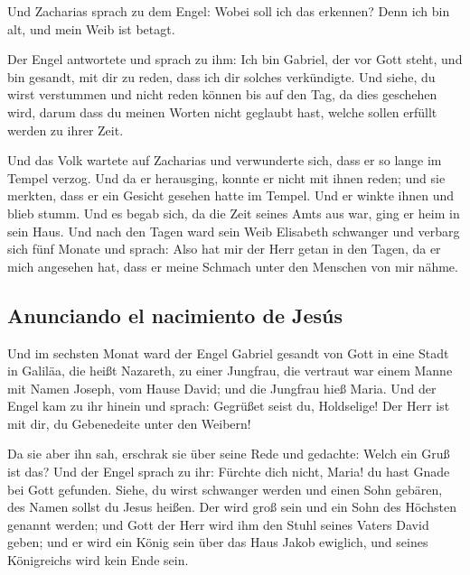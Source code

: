  Und Zacharias sprach zu dem Engel: Wobei soll ich das
erkennen? Denn ich bin alt, und mein Weib ist betagt.

 Der Engel antwortete und sprach zu ihm: Ich bin Gabriel,
der vor Gott steht, und bin gesandt, mit dir zu reden, dass ich dir
solches verkündigte.  Und siehe, du wirst verstummen und
nicht reden können bis auf den Tag, da dies geschehen wird, darum dass
du meinen Worten nicht geglaubt hast, welche sollen erfüllt werden zu
ihrer Zeit.

 Und das Volk wartete auf Zacharias und verwunderte sich,
dass er so lange im Tempel verzog.  Und da er herausging,
konnte er nicht mit ihnen reden; und sie merkten, dass er ein Gesicht
gesehen hatte im Tempel. Und er winkte ihnen und blieb stumm.
 Und es begab sich, da die Zeit seines Amts aus war, ging
er heim in sein Haus.  Und nach den Tagen ward sein Weib
Elisabeth schwanger und verbarg sich fünf Monate und sprach:
 Also hat mir der Herr getan in den Tagen, da er mich
angesehen hat, dass er meine Schmach unter den Menschen von mir nähme.

\hypertarget{anunciando-el-nacimiento-de-jesuxfas}{%
\subsection{Anunciando el nacimiento de
Jesús}\label{anunciando-el-nacimiento-de-jesuxfas}}

 Und im sechsten Monat ward der Engel Gabriel gesandt von
Gott in eine Stadt in Galiläa, die heißt Nazareth,  zu
einer Jungfrau, die vertraut war einem Manne mit Namen Joseph, vom Hause
David; und die Jungfrau hieß Maria.  Und der Engel kam zu
ihr hinein und sprach: Gegrüßet seist du, Holdselige! Der Herr ist mit
dir, du Gebenedeite unter den Weibern!

 Da sie aber ihn sah, erschrak sie über seine Rede und
gedachte: Welch ein Gruß ist das?  Und der Engel sprach
zu ihr: Fürchte dich nicht, Maria! du hast Gnade bei Gott gefunden.
 Siehe, du wirst schwanger werden und einen Sohn gebären,
des Namen sollst du Jesus heißen.  Der wird groß sein und
ein Sohn des Höchsten genannt werden; und Gott der Herr wird ihm den
Stuhl seines Vaters David geben;  und er wird ein König
sein über das Haus Jakob ewiglich, und seines Königreichs wird kein Ende
sein.

